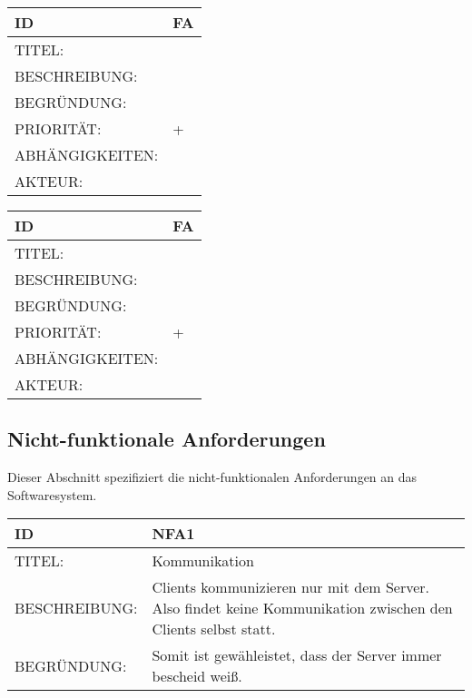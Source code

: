 \documentclass{uulm-assignment}
\begin{document}
    \begin{tabularx}{\textwidth}{|l|X |} \hline
        \textbf{ID} & \textbf{FA} \\
        \hline
        TITEL: &  \\
        \hline
        BESCHREIBUNG: &
        \\
        \hline
        BEGRÜNDUNG: & \\
        \hline
        PRIORITÄT: & +\\
        \hline
        ABHÄNGIGKEITEN: & \\
        \hline
        AKTEUR: & \\
        \hline
    \end{tabularx}
    
    \begin{tabularx}{\textwidth}{|l|X |} \hline
        \textbf{ID} & \textbf{FA} \\
        \hline
        TITEL: &  \\
        \hline
        BESCHREIBUNG: &
        \\
        \hline
        BEGRÜNDUNG: & \\
        \hline
        PRIORITÄT: & +\\
        \hline
        ABHÄNGIGKEITEN: & \\
        \hline
        AKTEUR: & \\
        \hline
    \end{tabularx}

    \subsection{Nicht-funktionale Anforderungen}

    Dieser Abschnitt spezifiziert die nicht-funktionalen Anforderungen an das Softwaresystem.

    \begin{tabularx}{\textwidth}{|l|X |} \hline
        \textbf{ID} & \textbf{NFA1} \\
        \hline
        TITEL: & Kommunikation \\
        \hline
        BESCHREIBUNG: & Clients kommunizieren nur mit dem Server. Also findet keine Kommunikation zwischen den Clients selbst statt. \\
        \hline
        BEGRÜNDUNG: & Somit ist gewähleistet, dass der Server immer bescheid weiß. \\
        \hline
    \end{tabularx}
\end{document}
